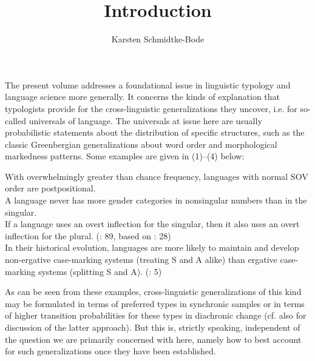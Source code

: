 \documentclass[output=paper]{langsci/langscibook}
\author{Karsten Schmidtke-Bode\affiliation{Leipzig University}}
\title{Introduction}
\begin{document}
\maketitle 

\title{\textsuperscript{}}





The present volume addresses a foundational issue in linguistic typology and language science more generally. It concerns the kinds of explanation that typologists provide for the cross-linguistic generalizations they uncover, i.e. for so-called universals of language. The universals at issue here are usually probabilistic statements about the distribution of specific structures, such as the classic Greenbergian generalizations about word order and morphological markedness patterns. Some examples are given in (1)–(4) below:

\ea 
{With overwhelmingly greater than chance frequency, languages with normal SOV order are postpositional. \citep[79]{Greenberg1963}}\\
\z
\ea\label{ex:key:}
{A language never has more gender categories in nonsingular numbers than in the singular. \citep[95]{Greenberg1963}}\\
\z
\ea\label{ex:key:}
{If a language uses an overt inflection for the singular, then it also uses an overt inflection for the plural. (\citealt{Croft2003}: 89, based on \citealt{Greenberg1966}: 28)}\\
\z 
\ea\label{ex:key:}
{In their historical evolution, languages are more likely to maintain and develop non-ergative case-marking systems (treating S and A alike) than ergative case-marking systems (splitting S and A). (\citealt{BickelEtAl2015}: 5)}\\
\z

As can be seen from these examples, cross-linguistic generalizations of this kind may be formulated in terms of preferred types in synchronic samples or in terms of higher transition probabilities for these types in diachronic change (cf. also \citealt{Greenberg1978,Maslova2000,Cysouw2011,Bickel2013} for discussion of the latter approach). But this is, strictly speaking, independent of the question we are primarily concerned with here, namely how to best account for such generalizations once they have been established.
\end{document}
